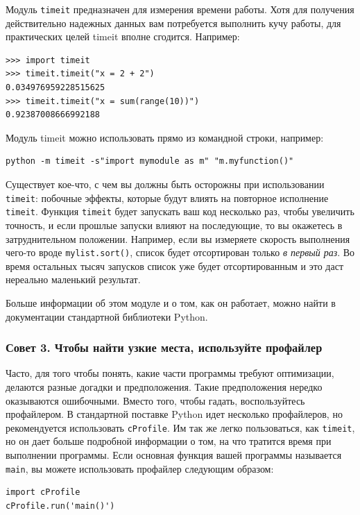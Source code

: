Модуль \texttt{timeit} предназначен для измерения времени работы. Хотя для получения действительно надежных данных вам потребуется выполнить кучу работы, для практических целей timeit вполне сгодится. Например:

\begin{lstlisting}
>>> import timeit
>>> timeit.timeit("x = 2 + 2")
0.034976959228515625
>>> timeit.timeit("x = sum(range(10))")
0.92387008666992188
\end{lstlisting}

Модуль timeit можно использовать прямо из командной строки, например:

\begin{lstlisting}
python -m timeit -s"import mymodule as m" "m.myfunction()"
\end{lstlisting}

Существует кое-что, с чем вы должны быть осторожны при использовании \texttt{timeit}: побочные эффекты, которые будут влиять на повторное исполнение \texttt{timeit}. Функция \texttt{timeit} будет запускать ваш код несколько раз, чтобы увеличить точность, и если прошлые запуски влияют на последующие, то вы окажетесь в затруднительном положении. Например, если вы измеряете скорость выполнения чего-то вроде \texttt{mylist.sort()}, список будет отсортирован только \textit{в первый раз}. Во время остальных тысяч запусков список уже будет отсортированным и это даст нереально маленький результат.

Больше информации об этом модуле и о том, как он работает, можно найти в документации стандартной библиотеки Python.

\subsubsection*{Совет 3. Чтобы найти узкие места, используйте профайлер}

Часто, для того чтобы понять, какие части программы требуют оптимизации, делаются разные догадки и предположения. Такие предположения нередко оказываются ошибочными. Вместо того, чтобы гадать, воспользуйтесь профайлером. В стандартной поставке Python идет несколько профайлеров, но рекомендуется использовать \texttt{cProfile}. Им так же легко пользоваться, как \texttt{timeit}, но он дает больше подробной информации о том, на что тратится время при выполнении программы. Если основная функция вашей программы называется \texttt{main}, вы можете использовать профайлер следующим образом:

\begin{lstlisting}
import cProfile
cProfile.run('main()')
\end{lstlisting}

